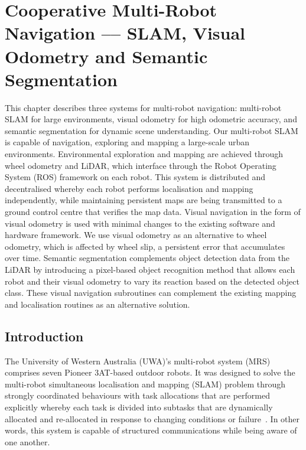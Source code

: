 
\chapter[Cooperative Multi-Robot Navigation]{Cooperative Multi-Robot Navigation --– SLAM, Visual Odometry and Semantic Segmentation}
\label{ch:cmrn}

\ifpdf
	\graphicspath{{Chapter4/Figs/Raster/}{Chapter4/Figs/PDF/}{Chapter4/Figs/}}
\else
	\graphicspath{{Chapter4/Figs/Vector/}{Chapter4/Figs/}}
\fi

This chapter describes three systems for multi-robot navigation: multi-robot SLAM for large environments, visual odometry for high odometric accuracy, and semantic segmentation for dynamic scene understanding.
Our multi-robot SLAM is capable of navigation, exploring and mapping a large-scale urban environments. Environmental exploration and mapping are achieved through wheel odometry and LiDAR, which interface through the Robot Operating System (ROS) framework on each robot. This system is distributed and decentralised whereby each robot performs localisation and mapping independently, while maintaining persistent maps are being transmitted to a ground control centre that verifies the map data.
Visual navigation in the form of visual odometry is used with minimal changes to the existing software and hardware framework. We use visual odometry as an alternative to wheel odometry, which is affected by wheel slip, a persistent error that accumulates over time.
Semantic segmentation complements object detection data from the LiDAR by introducing a pixel-based object recognition method that allows each robot and their visual odometry to vary its reaction based on the detected object class. These visual navigation subroutines can complement the existing mapping and localisation routines as an alternative solution.

\section{Introduction}
The University of Western Australia (UWA)'s multi-robot system (MRS)~\cite{boeing_wambot:_2012} comprises seven Pioneer 3AT-based outdoor robots. It was designed to solve the multi-robot simultaneous localisation and mapping (SLAM) problem through strongly coordinated behaviours with task allocations that are performed explicitly whereby each task is divided into subtasks that are dynamically allocated and re-allocated in response to changing conditions or failure~\cite{ortiz_task_2005}. In other words, this system is capable of structured communications while being aware of one another.


